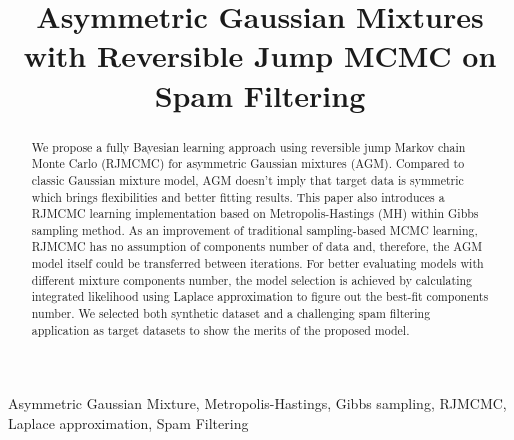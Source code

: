 \documentclass[conference]{IEEEtran}
\begin{document}
\title{Asymmetric Gaussian Mixtures with Reversible Jump MCMC on Spam Filtering\\
}

\author{
\and
{}
}

\maketitle

\begin{abstract}
We propose a fully Bayesian learning approach using reversible jump Markov  chain Monte Carlo (RJMCMC) for asymmetric Gaussian mixtures (AGM). Compared to classic Gaussian mixture model, AGM doesn't imply that target data is symmetric which brings flexibilities and better fitting results. This paper also introduces a RJMCMC learning implementation based on Metropolis-Hastings (MH) within Gibbs sampling method. As an improvement of traditional sampling-based MCMC learning, RJMCMC has no assumption of components number of data and, therefore, the AGM model itself could be transferred between iterations. For better evaluating models with different mixture components number, the model selection is achieved by calculating integrated likelihood using Laplace approximation to figure out the best-fit components number. We selected both synthetic dataset and a challenging spam filtering application as target datasets to show the merits of the proposed model. 
\end{abstract}

\begin{IEEEkeywords}
Asymmetric Gaussian Mixture, Metropolis-Hastings, Gibbs sampling, RJMCMC, Laplace approximation, Spam Filtering
\end{IEEEkeywords}
\end{document}
